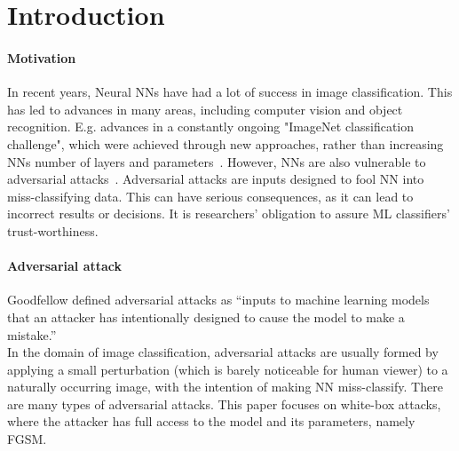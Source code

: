 \section{Introduction}

\paragraph{Motivation}
In recent years, Neural NNs have had a lot of success in image classification.
This has led to advances in many areas, including computer vision and object recognition.
E.g. advances in a constantly ongoing "ImageNet classification challenge", which were achieved
through new approaches,
rather than increasing NNs number of layers and parameters~\cite{russakovsky2015imagenet,DBLP:journals/corr/abs-1905-11946}.
However, NNs are also vulnerable to adversarial attacks~\cite{ilyas2019adversarial}.
Adversarial attacks are inputs designed to fool NN into miss-classifying data.
This can have serious consequences, as it can lead to incorrect results or decisions.
It is researchers' obligation to assure ML classifiers' trust-worthiness.

\paragraph{Adversarial attack}
Goodfellow defined adversarial attacks as “inputs to machine learning models that an
attacker has intentionally designed to cause the model to make a mistake.”
~\cite{DBLP:journals/corr/abs-1802-08195} \\
In the domain of image classification, adversarial attacks are usually formed by applying a small perturbation (which
is barely noticeable for human viewer) to a naturally occurring image, with the intention of making NN miss-classify.
There are many types of adversarial attacks.
This paper focuses on white-box attacks, where the attacker has full access to the model and its parameters,
namely FGSM.

